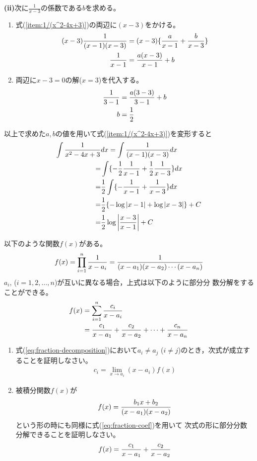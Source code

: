 \documentclass[twocolumn,11pt]{jarticle}
\begin{document}
\noindent
\textbf{(ii)}次に$\frac{1}{x-3}$の係数である$b$を求める。
\begin{enumerate}
\item 式(\ref{item:1/(x^2-4x+3)})の両辺に$(x-3)$をかける。
\begin{align}
  (x-3)\frac{1}{(x-1)(x-3)}&=(x-3)\{\frac{a}{x-1}+\frac{b}{x-3}\}\notag\\
  \frac{1}{x-1}&=\frac{a(x-3)}{x-1}+b\notag
\end{align}
\item 両辺に$x-3=0$の解($x=3$)を代入する。
\begin{align}
  \frac{1}{3-1}&=\frac{a(3-3)}{3-1}+b\notag\\
  b&=\frac{1}{2}\notag
\end{align}
\end{enumerate}
以上で求めた$a,b$の値を用いて式(\ref{item:1/(x^2-4x+3)})を変形すると
\begin{align}
  \int \frac{1}{x^2-4x+3}&dx=\int \frac{1}{(x-1)(x-3)}dx\notag\\
  =&\int\{-\frac{1}{2}\frac{1}{x-1}+\frac{1}{2}\frac{1}{x-3}\}dx\notag\\
  =&\frac{1}{2}\int\{-\frac{1}{x-1}+\frac{1}{x-3}\}dx\notag\\
  =&\frac{1}{2}\{-\log|x-1|+\log|x-3|\}+C\notag\\
  =&\frac{1}{2}\log\left|\frac{x-3}{x-1}\right|+C\notag
\end{align}

\question
以下のような関数$f(x)$がある。
\begin{align}
  f(x)=\prod_{i=1}^n\frac{1}{x-a_i}
  =\frac{1}{(x-a_1)(x-a_2)\cdots(x-a_n)}\notag
\end{align}
$a_i$, ($i=1,2,\ldots,n$)が互いに異なる場合，上式は以下のように部分分
数分解をすることができる。
\begin{align}
  \label{eq:fraction-decomposition}
  f(x)&=\sum_{i=1}^n\frac{c_i}{x-a_i}\\
  &=\frac{c_1}{x-a_1}+\frac{c_2}{x-a_2}+\cdots+\frac{c_n}{x-a_n}\notag
\end{align}
\begin{enumerate}
\item 式(\ref{eq:fraction-decomposition})において$a_i\ne a_j$ ($i\ne
  j$)のとき，次式が成立することを証明しなさい。
\begin{align}
  \label{eq:fraction-coef}
  c_i=\lim_{x\to a_i}(x-a_i)f(x)
\end{align}
\item 被積分関数$f(x)$が
\begin{align}
  f(x)=\frac{b_1x+b_2}{(x-a_1)(x-a_2)}\notag
\end{align}
という形の時にも同様に式(\ref{eq:fraction-coef})を用いて
次式の形に部分分数分解できることを証明しなさい。
\begin{align}
  f(x)=\frac{c_1}{x-a_1}+\frac{c_2}{x-a_2}\notag
\end{align}
\end{enumerate}
\end{document}
